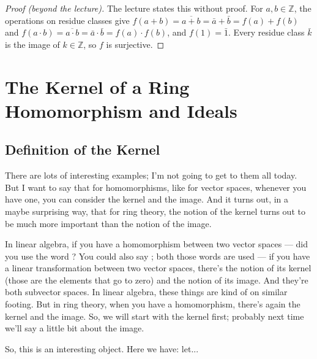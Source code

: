 \begin{content}

\begin{proof}[Proof (beyond the lecture)]
The lecture states this without proof. For $a, b \in \mathbb{Z}$, the operations on residue classes give $f(a + b) = \overline{a + b} = \bar{a} + \bar{b} = f(a) + f(b)$ and $f(a \cdot b) = \overline{a \cdot b} = \bar{a} \cdot \bar{b} = f(a) \cdot f(b)$, and $f(1) = \bar{1}$. Every residue class $\bar{k}$ is the image of $k \in \mathbb{Z}$, so $f$ is surjective.
\end{proof}
\end{content}

\section{The Kernel of a Ring Homomorphism and Ideals}
\subsection{Definition of the Kernel}

\begin{speech}[00:30:49 - 00:32:06]
There are lots of interesting examples; I'm not going to get to them all today. But I want to say that  for homomorphisms, like for vector spaces, whenever you have one, you can consider the kernel and the image.  And it turns out, in a maybe surprising way, that for ring theory, the notion of the kernel turns out to be much more important than the notion of the image.

In linear algebra, if you have a homomorphism between two vector spaces --- did you use the word ? You could also say ; both those words are used --- if you have a linear transformation between two vector spaces, there's the notion of its kernel (those are the elements that go to zero) and the notion of its image. And they're both subvector spaces. In linear algebra, these things are kind of on similar footing. But in ring theory, when you have a homomorphism, there's again the kernel and the image. So, we will start with the kernel first; probably next time we'll say a little bit about the image.

So, this is an interesting object. Here we have: let...
\end{speech}

